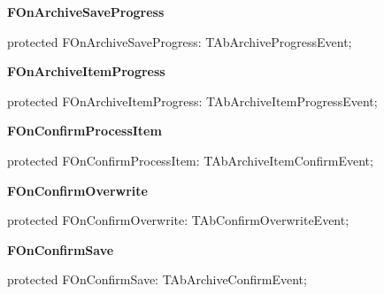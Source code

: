\documentclass{report}
\newif\ifpdf
\begin{document}
\begin{list}{}
\begin{flushleft}
\ifpdf
\end{flushleft}
\fi


\par  \label{AbArcTyp.TAbArchive-FOnArchiveSaveProgress}
\item[\textbf{FOnArchiveSaveProgress}\hfill]
\ifpdf
\begin{flushleft}
\fi
\begin{ttfamily}
protected FOnArchiveSaveProgress: TAbArchiveProgressEvent;\end{ttfamily}

\ifpdf
\end{flushleft}
\fi


\par  \label{AbArcTyp.TAbArchive-FOnArchiveItemProgress}
\item[\textbf{FOnArchiveItemProgress}\hfill]
\ifpdf
\begin{flushleft}
\fi
\begin{ttfamily}
protected FOnArchiveItemProgress: TAbArchiveItemProgressEvent;\end{ttfamily}

\ifpdf
\end{flushleft}
\fi


\par  \label{AbArcTyp.TAbArchive-FOnConfirmProcessItem}
\item[\textbf{FOnConfirmProcessItem}\hfill]
\ifpdf
\begin{flushleft}
\fi
\begin{ttfamily}
protected FOnConfirmProcessItem: TAbArchiveItemConfirmEvent;\end{ttfamily}

\ifpdf
\end{flushleft}
\fi


\par  \label{AbArcTyp.TAbArchive-FOnConfirmOverwrite}
\item[\textbf{FOnConfirmOverwrite}\hfill]
\ifpdf
\begin{flushleft}
\fi
\begin{ttfamily}
protected FOnConfirmOverwrite: TAbConfirmOverwriteEvent;\end{ttfamily}

\ifpdf
\end{flushleft}
\fi


\par  \label{AbArcTyp.TAbArchive-FOnConfirmSave}
\item[\textbf{FOnConfirmSave}\hfill]
\ifpdf
\begin{flushleft}
\fi
\begin{ttfamily}
protected FOnConfirmSave: TAbArchiveConfirmEvent;\end{ttfamily}


\end{flushleft}
\end{list}
\end{document}
